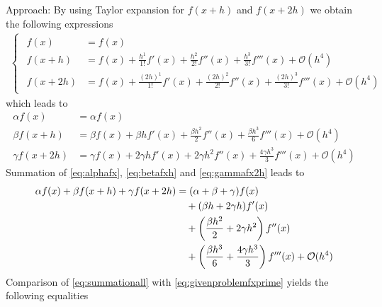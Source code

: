 \documentclass[12pt]{article}
\begin{document}
Approach: By using Taylor expansion for $f(x+h)$ and $f(x+2h)$
we obtain the following expressions
\begin{align}
	\label{eq:firstfhreeTaylor}
	\begin{cases}
		\begin{aligned}
			f(x)    & = f(x)   \\
			f(x+ h) & = f(x) 
			+ \frac{h^1}{1!} f'(x)  
			+ \frac{h^2}{2!} f''(x)  
			+ \frac{h^3}{3!} f'''(x) 
			+ \mathcal{O}(h^4) \\
			f(x+2h) & = f(x) 
			+ \frac{(2h)^1}{1!} f'(x) 
			+ \frac{(2h)^2}{2!} f''(x) 
			+ \frac{(2h)^3}{3!} f'''(x) 
			+ \mathcal{O}(h^4)
		\end{aligned}
	\end{cases}
\end{align}
which leads to 
\begin{align}
	\alpha f(x)    & = \alpha f(x)  \label{eq:alphafx} \\
	\beta f(x+ h)  & = \beta f(x) 
	+ \beta h f'(x)  
	+ \frac{\beta h^2}{2} f''(x)
	+ \frac{\beta h^3}{6} f'''(x)
	+ \mathcal{O}(h^4)              \label{eq:betafxh} \\
	\gamma f(x+2h) & = \gamma f(x) 
	+ 2\gamma h f'(x)  
	+ 2\gamma h^2 f''(x)
	+ \frac{4\gamma h^3}{3} f'''(x)
	+ \mathcal{O}(h^4) \label{eq:gammafx2h}
\end{align}
Summation of \eqref{eq:alphafx}, \eqref{eq:betafxh} and \eqref{eq:gammafx2h} leads to
\begin{align}\label{eq:summationall}
	\alpha f(x) + \beta f(x+h) + \gamma f(x+2h) 
	 & = (\alpha + \beta + \gamma)f(x) \notag                                      \\
	 & \quad + (\beta h + 2 \gamma h)f'(x) \notag                                  \\
	 & \quad + \left( \frac{\beta h^2}{2} + 2\gamma h^2 \right)f''(x) \notag       \\
	 & \quad + \left( \frac{\beta h^3}{6} + \frac{4\gamma h^3}{3}  \right) f'''(x)
	+ \mathcal{O}(h^4)
\end{align}
Comparison of \eqref{eq:summationall} with \eqref{eq:givenproblemfxprime}
yields the following equalities
\end{document}
